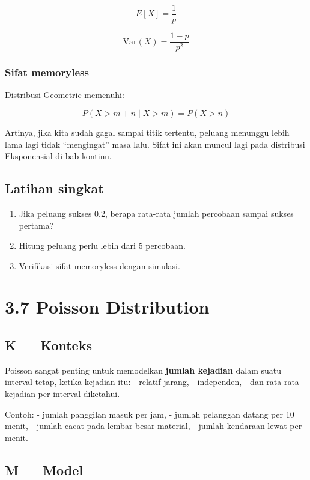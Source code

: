 \documentclass[
  letterpaper,
  DIV=11,
  numbers=noendperiod]{scrreprt}
\providecommand{\tightlist}{%
  \setlength{\itemsep}{0pt}\setlength{\parskip}{0pt}}
\begin{document}
\[
E[X]=\frac{1}{p}
\]

\[
\mathrm{Var}(X)=\frac{1-p}{p^2}
\]

\subsubsection{Sifat memoryless}\label{sifat-memoryless}

Distribusi Geometric memenuhi:

\[
P(X>m+n \mid X>m)=P(X>n)
\]

Artinya, jika kita sudah gagal sampai titik tertentu, peluang menunggu
lebih lama lagi tidak ``mengingat'' masa lalu. Sifat ini akan muncul
lagi pada distribusi Eksponensial di bab kontinu.

\subsection{Latihan singkat}\label{latihan-singkat-9}

\begin{enumerate}
\def\labelenumi{\arabic{enumi}.}
\tightlist
\item
  Jika peluang sukses 0.2, berapa rata-rata jumlah percobaan sampai
  sukses pertama?
\item
  Hitung peluang perlu lebih dari 5 percobaan.
\item
  Verifikasi sifat memoryless dengan simulasi.
\end{enumerate}

\section{3.7 Poisson Distribution}\label{poisson-distribution}

\subsection{K --- Konteks}\label{k-konteks-15}

Poisson sangat penting untuk memodelkan \textbf{jumlah kejadian} dalam
suatu interval tetap, ketika kejadian itu: - relatif jarang, -
independen, - dan rata-rata kejadian per interval diketahui.

Contoh: - jumlah panggilan masuk per jam, - jumlah pelanggan datang per
10 menit, - jumlah cacat pada lembar besar material, - jumlah kendaraan
lewat per menit.

\subsection{M --- Model}\label{m-model-15}
\end{document}
